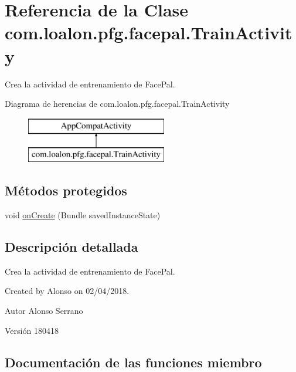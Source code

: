 \hypertarget{classcom_1_1loalon_1_1pfg_1_1facepal_1_1_train_activity}{}\section{Referencia de la Clase com.\+loalon.\+pfg.\+facepal.\+Train\+Activity}
\label{classcom_1_1loalon_1_1pfg_1_1facepal_1_1_train_activity}


Crea la actividad de entrenamiento de Face\+Pal.  


Diagrama de herencias de com.\+loalon.\+pfg.\+facepal.\+Train\+Activity\begin{figure}[H]
\begin{center}
\leavevmode
\includegraphics[height=2.000000cm]{classcom_1_1loalon_1_1pfg_1_1facepal_1_1_train_activity}
\end{center}
\end{figure}
\subsection*{Métodos protegidos}
\begin{DoxyCompactItemize}
\item 
void \mbox{\hyperlink{classcom_1_1loalon_1_1pfg_1_1facepal_1_1_train_activity_aed9fe1619d857821650314ca9b3537d7}{on\+Create}} (Bundle saved\+Instance\+State)
\end{DoxyCompactItemize}


\subsection{Descripción detallada}
Crea la actividad de entrenamiento de Face\+Pal. 

Created by Alonso on 02/04/2018. \begin{DoxyAuthor}{Autor}
Alonso Serrano 
\end{DoxyAuthor}
\begin{DoxyVersion}{Versión}
180418 
\end{DoxyVersion}


\subsection{Documentación de las funciones miembro}
\mbox{\label{classcom_1_1loalon_1_1pfg_1_1facepal_1_1_train_activity_aed9fe1619d857821650314ca9b3537d7}} 
